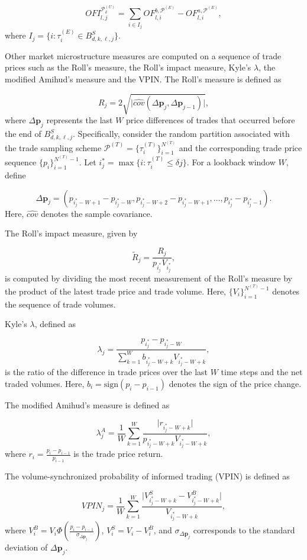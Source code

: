\documentclass{rQUF2e}
\theoremstyle{plain}
\theoremstyle{definition}
\theoremstyle{remark}
\begin{document}
$$
    OFI^{\mathcal{P}^{(U)}_{\delta}}_{l, j} = \sum_{i \in I_j} OF^{b, \mathcal{P}^{(E)}}_{l,i} - OF^{a, \mathcal{P}^{(E)}}_{l,i},
$$
where $I_j = \{ i : \tau^{(E)}_i \in B^S_{d,k,\ell,j} \}$.

Other market microstructure measures are computed on a sequence of trade prices such as the Roll's measure, the Roll's impact measure, Kyle's $\lambda$, the modified Amihud's measure and the VPIN. The Roll’s measure is defined as

\[
    R_j = 2 \sqrt{\Big| \hat{cov}(\Delta \mathbf{p}_j, \Delta \mathbf{p}_{j - 1}) \Big|},
\]
where \(\Delta \mathbf{p}_j\) represents the last \(W\) price differences of trades that occurred before the end of $B^S_{d,k,\ell,j}$. Specifically, consider the random partition associated with the trade sampling scheme \(\mathcal{P}^{(T)} = \{ \tau^{(T)}_i \}_{i=1}^{N^{(T)}}\) and the corresponding trade price sequence \(\{p_i\}_{i=1}^{N^{(T)}-1}\). Let \(i^*_j = \max\{i : \tau^{(T)}_i \leq \delta j\}\). For a lookback window \(W\), define

\[
    \Delta \mathbf{p}_j = (p_{i^*_j - W + 1} - p_{i^*_j - W}, p_{i^*_j - W + 2} - p_{i^*_j - W + 1}, \dots, p_{i^*_j} - p_{i^*_j - 1}).
\]
Here, \(\hat{cov}\) denotes the sample covariance.

The Roll’s impact measure, given by

\[
    \tilde{R}_j = \frac{R_j}{p_{i^*_j} V_{i^*_j}},
\]
is computed by dividing the most recent measurement of the Roll’s measure by the product of the latest trade price and trade volume. Here, \(\{ V_i \}_{i=1}^{N^{(T)}-1}\) denotes the sequence of trade volumes.

Kyle’s \(\lambda\), defined as

\[
    \lambda_j = \frac{p_{i^*_j} - p_{i^*_j - W}}{\sum_{k=1}^W b_{i^*_j - W + k} V_{i^*_j - W + k}},
\]
is the ratio of the difference in trade prices over the last \(W\) time steps and the net traded volumes. Here, \(b_i = \text{sign}(p_i - p_{i-1})\) denotes the sign of the price change.

The modified Amihud’s measure is defined as

\[
    \lambda^A_j = \frac{1}{W} \sum_{k=1}^W \frac{\big| r_{i^*_j - W + k} \big|}{p_{i^*_j - W + k} V_{i^*_j - W + k}},
\]
where \(r_i = \frac{p_i - p_{i-1}}{p_{i-1}}\) is the trade price return.

The volume-synchronized probability of informed trading (VPIN) is defined as

\[
    VPIN_j = \frac{1}{W} \sum_{k=1}^W \frac{\big| V_{i^*_j - W + k}^S - V_{i^*_j - W + k}^B \big|}{V_{i^*_j - W + k}},
\]
where \(V^B_i = V_i \Phi \left( \frac{p_i - p_{i-1}}{\sigma_{\Delta \mathbf{p}_j}} \right)\), \(V^S_i = V_i - V^B_i\), and \(\sigma_{\Delta \mathbf{p}_j}\) corresponds to the standard deviation of \(\Delta \mathbf{p}_j\).
\end{document}
